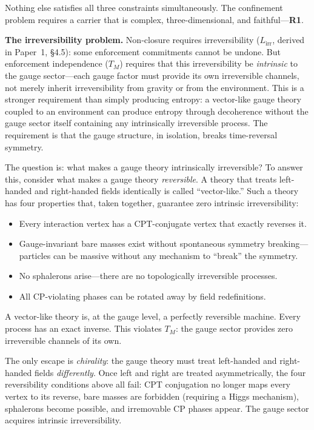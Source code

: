 \documentclass[11pt]{article}
\newenvironment{varlist}{\begin{itemize}[nosep,leftmargin=2em]}{\end{itemize}}
\begin{document}
\noindent Nothing else satisfies all three constraints simultaneously.  The confinement problem requires a carrier that is complex, three-dimensional, and faithful---\textbf{R1}.

\medskip
\textbf{The irreversibility problem.}  Non-closure requires irreversibility ($L_{\mathrm{irr}}$, derived in Paper~1, \S4.5): some enforcement commitments cannot be undone.  But enforcement independence ($T_M$) requires that this irreversibility be \emph{intrinsic} to the gauge sector---each gauge factor must provide its own irreversible channels, not merely inherit irreversibility from gravity or from the environment.  This is a stronger requirement than simply producing entropy: a vector-like gauge theory coupled to an environment can produce entropy through decoherence without the gauge sector itself containing any intrinsically irreversible process.  The requirement is that the gauge structure, in isolation, breaks time-reversal symmetry.

The question is: what makes a gauge theory intrinsically irreversible?  To answer this, consider what makes a gauge theory \emph{reversible}.  A theory that treats left-handed and right-handed fields identically is called ``vector-like.''  Such a theory has four properties that, taken together, guarantee zero intrinsic irreversibility:

\begin{varlist}
\item Every interaction vertex has a CPT-conjugate vertex that exactly reverses it.
\item Gauge-invariant bare masses exist without spontaneous symmetry breaking---particles can be massive without any mechanism to ``break'' the symmetry.
\item No sphalerons arise---there are no topologically irreversible processes.
\item All CP-violating phases can be rotated away by field redefinitions.
\end{varlist}

\noindent A vector-like theory is, at the gauge level, a perfectly reversible machine.  Every process has an exact inverse.  This violates $T_M$: the gauge sector provides zero irreversible channels of its own.

The only escape is \emph{chirality}: the gauge theory must treat left-handed and right-handed fields \emph{differently}.  Once left and right are treated asymmetrically, the four reversibility conditions above all fail: CPT conjugation no longer maps every vertex to its reverse, bare masses are forbidden (requiring a Higgs mechanism), sphalerons become possible, and irremovable CP phases appear.  The gauge sector acquires intrinsic irreversibility.
\end{document}
